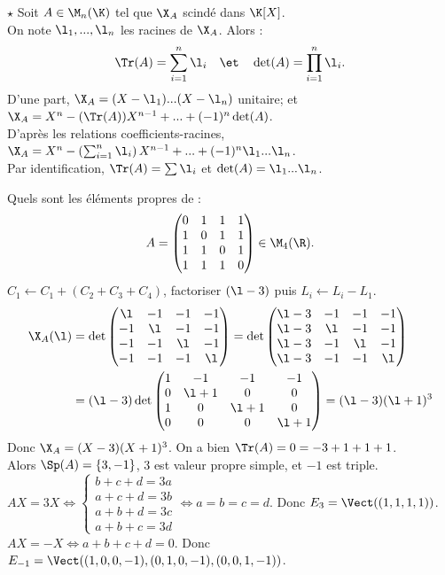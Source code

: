 \documentclass[11pt]{article}
\begin{document}
\begin{prop}{$\star$}{}
    Soit $A\in \M_n(\K)$ tel que $\X_A$ scindé dans $\K[X]$.\\
    On note $\l_1,...,\l_n$ les racines de $\X_A$. Alors :
    \begin{equation*}
        \Tr(A)=\sum_{i=1}^n\l_i \quad\et\quad \det(A)=\prod_{i=1}^n\l_i.
    \end{equation*}
    \tcblower
    D'une part, $\X_A=(X-\l_1)...(X-\l_n)$ unitaire; et $\X_A=X^n-(\Tr(A))X^{n-1}+...+(-1)^n\det(A)$.\\
    D'après les relations coefficients-racines, $\X_A=X^n-\left( \sum_{i=1}^n\l_i \right)X^{n-1}+...+(-1)^n\l_1...\l_n$.\\
    Par identification, $\Tr(A)=\sum\l_i$  et $\det(A)=\l_1...\l_n$.
\end{prop}

\begin{ex}{}{}
    Quels sont les éléments propres de :
    \begin{equation*}
        A=\begin{pmatrix}
            0&1&1&1\\1&0&1&1\\1&1&0&1\\1&1&1&0
        \end{pmatrix}\in \M_4(\R).
    \end{equation*}
    \tcblower
    $C_1\gets C_1 + (C_2+C_3+C_4)$, factoriser $(\l-3)$ puis $L_i \gets L_i - L_1$.
    \begin{align*}
        \X_A(\l) &= \det\begin{pmatrix}\l&-1&-1&-1\\-1&\l&-1&-1\\-1&-1&\l&-1\\-1&-1&-1&\l\end{pmatrix}=\det\begin{pmatrix}\l-3&-1&-1&-1\\\l-3&\l&-1&-1\\\l-3&-1&\l&-1\\\l-3&-1&-1&\l\end{pmatrix}\\
        &=(\l-3)\det\begin{pmatrix}1&-1&-1&-1\\0&\l+1&0&0\\1&0&\l+1&0\\0&0&0&\l+1\end{pmatrix}=(\l-3)(\l+1)^3
    \end{align*}
    Donc $\X_A=(X-3)(X+1)^3$. On a bien $\Tr(A)=0=-3+1+1+1$.\\
    Alors $\Sp(A)=\{3,-1\}$, $3$ est valeur propre simple, et $-1$ est triple.\\
    $AX=3X\iff\begin{cases}b+c+d=3a\\a+c+d=3b\\a+b+d=3c\\a+b+c=3d\end{cases}\iff a=b=c=d$. Donc $E_3=\Vect((1,1,1,1))$.\\
    $AX=-X\iff a+b+c+d=0$. Donc $E_{-1}=\Vect((1,0,0,-1), (0,1,0,-1), (0,0,1,-1))$.
\end{ex}
\end{document}
